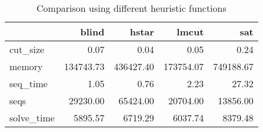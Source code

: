 \begin{table}[htbp]
\centering
\begingroup\small
\begin{tabular}{lrrrr}
  \hline
 & blind & hstar & lmcut & sat \\ 
  \hline
cut\_size & 0.07 & 0.04 & 0.05 & 0.24 \\ 
  memory & 134743.73 & 436427.40 & 173754.07 & 749188.67 \\ 
  seq\_time & 1.05 & 0.76 & 2.23 & 27.32 \\ 
  seqs & 29230.00 & 65424.00 & 20704.00 & 13856.00 \\ 
  solve\_time & 5895.57 & 6719.29 & 6037.74 & 8379.48 \\ 
   \hline
\end{tabular}
\endgroup
\caption{Comparison using different heuristic functions} 
\label{tab:summary_heuristics}
\end{table}
